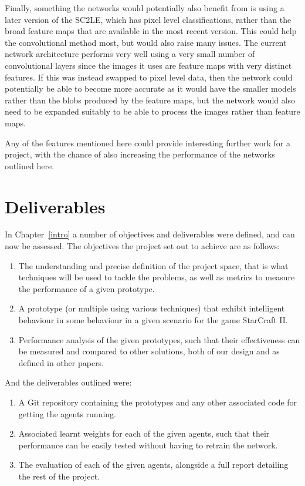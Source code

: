 Finally, something the networks would potentially also benefit from is using a
later version of the SC2LE, which has pixel level classifications, rather than
the broad feature maps that are available in the most recent version. This could
help the convolutional method most, but would also raise many issues. The
current network architecture performs very well using a very small number of
convolutional layers since the images it uses are feature maps with very
distinct features. If this was instead swapped to pixel level data, then the
network could potentially be able to become more accurate as it would have the
smaller models rather than the blobs produced by the feature maps, but the
network would also need to be expanded suitably to be able to process the
images rather than feature maps.

Any of the features mentioned here could provide interesting further work for
a project, with the chance of also increasing the performance of the networks
outlined here.

\section{Deliverables}

In Chapter~\ref{intro} a number of objectives and deliverables were defined, and
can now be assessed. The objectives the project set out to achieve are as
follows:

\begin{enumerate}
    \item The understanding and precise definition of the project space, that is
        what techniques will be used to tackle the problems, as well as metrics
        to measure the performance of a given prototype.
    \item A prototype (or multiple using various techniques) that exhibit
        intelligent behaviour in some behaviour in a given scenario for
        the game StarCraft II\@.
    \item Performance analysis of the given prototypes, such that their
        effectiveness can be measured and compared to other solutions, both of
        our design and as defined in other papers.
\end{enumerate}

And the deliverables outlined were:

\begin{enumerate}
    \item A Git repository containing the prototypes and any other associated
        code for getting the agents running.
    \item Associated learnt weights for each of the given agents, such that
        their performance can be easily tested without having to retrain
        the network.
    \item The evaluation of each of the given agents, alongside a full report
        detailing the rest of the project.
\end{enumerate}


